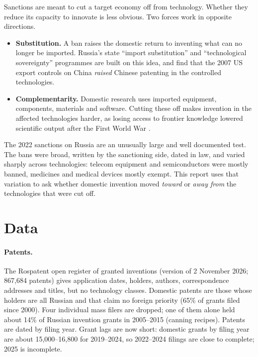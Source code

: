 \documentclass[11pt,a4paper]{article}
\begin{document}
Sanctions are meant to cut a target economy off from technology. Whether they reduce its capacity to innovate
is less obvious. Two forces work in opposite directions.
\begin{itemize}\setlength\itemsep{0.1em}
  \item \textbf{Substitution.} A ban raises the domestic return to inventing what can no longer be imported.
  Russia's state ``import substitution'' and ``technological sovereignty'' programmes are built on this idea, and
  \citet{LiuLiuMakarinWen2025} find that the 2007 US export controls on China \emph{raised} Chinese patenting in
  the controlled technologies.
  \item \textbf{Complementarity.} Domestic research uses imported equipment, components, materials and software.
  Cutting these off makes invention in the affected technologies harder, as losing access to frontier
  knowledge lowered scientific output after the First World War \citep{IariaSchwarzWaldinger2018}.
\end{itemize}
The 2022 sanctions on Russia are an unusually large and well documented test. The bans were broad, written by
the sanctioning side, dated in law, and varied sharply across technologies: telecom equipment and semiconductors
were mostly banned, medicines and medical devices mostly exempt. This report uses that variation to ask whether
domestic invention moved \emph{toward} or \emph{away from} the technologies that were cut off.

\section{Data}

\paragraph{Patents.} The Rospatent open register of granted inventions (version of 2 November 2026; 867,684
patents) gives application dates, holders, authors, correspondence addresses and titles, but no technology
classes. Domestic patents are those whose holders are all Russian and that claim no foreign priority (65\% of
grants filed since 2000). Four individual mass filers are dropped; one of them alone held about 14\% of
Russian invention grants in 2005--2015 (canning recipes). Patents are dated by filing year. Grant lags are now
short: domestic grants by filing year are about 15,000--16,800 for 2019--2024, so 2022--2024 filings are close
to complete; 2025 is incomplete.
\end{document}
